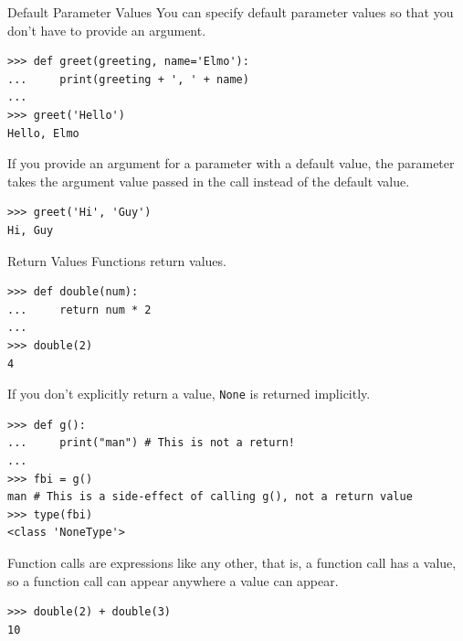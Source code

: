 \documentclass[smaller, aspectratio=1610]{beamer}
\begin{document}
\begin{frame}[label={sec:orge6bf364},fragile]{Default Parameter Values}
 You can specify default parameter values so that you don't have to provide an argument.

\lstset{language=Python,label= ,caption= ,captionpos=b,numbers=none}
\begin{lstlisting}
>>> def greet(greeting, name='Elmo'):
...     print(greeting + ', ' + name)
...
>>> greet('Hello')
Hello, Elmo
\end{lstlisting}

If you provide an argument for a parameter with a default value, the parameter takes the argument value passed in the call instead of the default value.

\lstset{language=Python,label= ,caption= ,captionpos=b,numbers=none}
\begin{lstlisting}
>>> greet('Hi', 'Guy')
Hi, Guy
\end{lstlisting}
\end{frame}

\begin{frame}[label={sec:orgafee6e7},fragile]{Return Values}
 Functions return values.

\lstset{language=Python,label= ,caption= ,captionpos=b,numbers=none}
\begin{lstlisting}
>>> def double(num):
...     return num * 2
...
>>> double(2)
4
\end{lstlisting}

If you don't explicitly return a value, \texttt{None} is returned implicitly.

\lstset{language=Python,label= ,caption= ,captionpos=b,numbers=none}
\begin{lstlisting}
>>> def g():
...     print("man") # This is not a return!
...
>>> fbi = g()
man # This is a side-effect of calling g(), not a return value
>>> type(fbi)
<class 'NoneType'>
\end{lstlisting}

Function calls are expressions like any other, that is, a function call has a value, so a function call can appear anywhere a value can appear.

\lstset{language=Python,label= ,caption= ,captionpos=b,numbers=none}
\begin{lstlisting}
>>> double(2) + double(3)
10
\end{lstlisting}
\end{frame}
\end{document}
